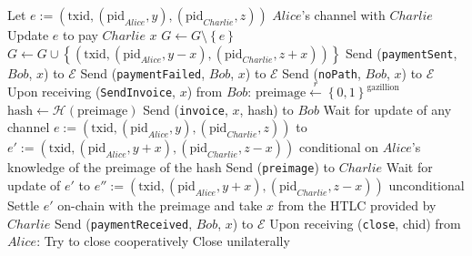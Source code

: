 \begin{algorithmic}[1]
          \State Let $e := \left(\mathrm{txid}, \left(\mathrm{pid}_{Alice},
          y\right), \left(\mathrm{pid}_{Charlie}, z\right)\right)$ $Alice$'s
          channel with $Charlie$
          \State Update $e$ to pay $Charlie$ $x$ 
          \State $G \leftarrow G \setminus \left\{e\right\}$
          \State $G \leftarrow G \cup \left\{\left(\mathrm{txid},
          \left(\mathrm{pid}_{Alice}, y - x\right),
          \left(\mathrm{pid}_{Charlie}, z + x\right)\right)\right\}$
          \State Send (\texttt{paymentSent}, $Bob$, $x$) to $\mathcal{E}$
        \Else
          \State Send (\texttt{paymentFailed}, $Bob$, $x$) to $\mathcal{E}$
        \EndIf
      \Else {}
        \State Send (\texttt{noPath}, $Bob$, $x$) to $\mathcal{E}$
      \EndIf
    \State
    \State Upon receiving (\texttt{SendInvoice}, $x$) from $Bob$:
      \State $\mathrm{preimage} \overset{r}{\leftarrow}
      \left\{0,1\right\}^{\mathrm{gazillion}}$
      \State $\mathrm{hash} \leftarrow
      \mathcal{H}\left(\mathrm{preimage}\right)$
      \State Send (\texttt{invoice}, $x$, hash) to $Bob$
      \State Wait for update of any channel $e := \left(\mathrm{txid},
      \left(\mathrm{pid}_{Alice}, y\right), \left(\mathrm{pid}_{Charlie},
      z\right)\right)$ to $e' := \left(\mathrm{txid},
      \left(\mathrm{pid}_{Alice}, y + x\right), \left(\mathrm{pid}_{Charlie}, z
      - x\right)\right)$ conditional on $Alice$'s knowledge of the preimage of
      the hash
      \State Send (\texttt{preimage}) to $Charlie$
      \State Wait for update of $e'$ to $e'' := \left(\mathrm{txid},
      \left(\mathrm{pid}_{Alice}, y + x\right), \left(\mathrm{pid}_{Charlie}, z
      - x\right)\right)$ unconditional
        \State Settle $e'$ on-chain with the preimage and take $x$ from the HTLC
        provided by $Charlie$
      \EndIf
      \State Send (\texttt{paymentReceived}, $Bob$, $x$) to $\mathcal{E}$
    \State
    \State Upon receiving (\texttt{close}, chid) from $Alice$:
        \State Try to close cooperatively 
         
          \State Close unilaterally 
        \EndIf
      \EndIf
  \end{algorithmic}
\hrulefill
\ \\ 
